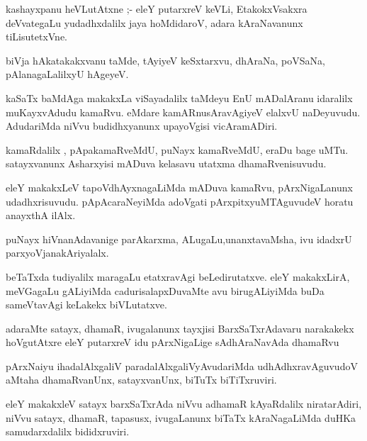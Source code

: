 \documentclass{article}
\begin{document}
\begin{mn}
kashayxpanu heVLutAtxne ;- eleY putarxreV keVLi, EtakokxVsakxra deVvategaLu 
yudadhxdalilx jaya hoMdidaroV, adara kAraNavanunx tiLisutetxVne.
\end{mn}

\begin{mn}
biVja hAkatakakxvanu taMde, tAyiyeV keSxtarxvu, dhAraNa, poVSaNa, pAlanagaLalilxyU hAgeyeV. 
\end{mn}

\begin{mn}
kaSaTx baMdAga makakxLa viSayadalilx taMdeyu EnU mADalAranu idaralilx 
muKayxvAdudu kamaRvu. eMdare kamARnusAravAgiyeV elalxvU naDeyuvudu.
 AdudariMda niVvu budidhxyanunx upayoVgisi vicAramADiri.
\end{mn}

\begin{mn}
kamaRdalilx , pApakamaRveMdU, puNayx kamaRveMdU, eraDu bage uMTu. satayxvanunx 
Asharxyisi mADuva kelasavu utatxma dhamaRvenisuvudu.
\end{mn}

\begin{mn}
eleY makakxLeV tapoVdhAyxnagaLiMda mADuva kamaRvu, pArxNigaLanunx  udadhxrisuvudu.
pApAcaraNeyiMda adoVgati pArxpitxyuMTAguvudeV horatu anayxthA ilAlx.
\end{mn}

\begin{mn}
puNayx hiVnanAdavanige parAkarxma, ALugaLu,unanxtavaMsha, ivu  idadxrU 
parxyoVjanakAriyalalx.
\end{mn}

\begin{mn}
beTaTxda tudiyalilx maragaLu etatxravAgi beLedirutatxve. eleY makakxLirA,
 meVGagaLu gALiyiMda cadurisalapxDuvaMte avu birugALiyiMda buDa sameVtavAgi 
 keLakekx biVLutatxve. 
\end{mn}

\begin{mn}
adaraMte satayx, dhamaR, ivugalanunx tayxjisi BarxSaTxrAdavaru narakakekx
 hoVgutAtxre eleY putarxreV idu pArxNigaLige sAdhAraNavAda dhamaRvu
\end{mn}

\begin{mn}
pArxNaiyu ihadalAlxgaliV paradalAlxgaliVyAvudariMda udhAdhxravAguvudoV 
aMtaha dhamaRvanUnx, satayxvanUnx, biTuTx biTiTxruviri. 
\end{mn}

\begin{mn}
eleY makakxleV satayx barxSaTxrAda niVvu adhamaR kAyaRdalilx niratarAdiri, 
niVvu satayx, dhamaR, tapasusx, ivugaLanunx biTaTx kAraNagaLiMda duHKa 
samudarxdalilx bididxruviri. 
\end{mn}
\end{document}
